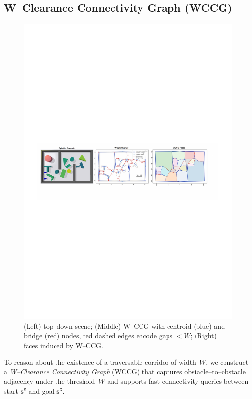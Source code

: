 \subsection{W–Clearance Connectivity Graph (WCCG)}
\label{subsec:wccg}
\begin{figure}[t]
  \centering
  \includegraphics[width=\linewidth]{figures/wccg.pdf}
  \vspace{-3mm}
  \caption{(Left) top–down scene; (Middle) W–CCG with centroid (blue) and bridge (red) nodes, red dashed edges encode gaps $<W$; (Right) faces induced by W–CCG.}
  \label{fig:wccg}
  \vspace{-4mm}
\end{figure}

To reason about the existence of a traversable corridor of width~$W$, we construct a
\emph{W–Clearance Connectivity Graph} (WCCG) that captures obstacle–to–obstacle
adjacency under the threshold~$W$ and supports fast connectivity queries between
start $\mathbf{s}^{\texttt{S}}$ and goal $\mathbf{s}^{\texttt{G}}$.


